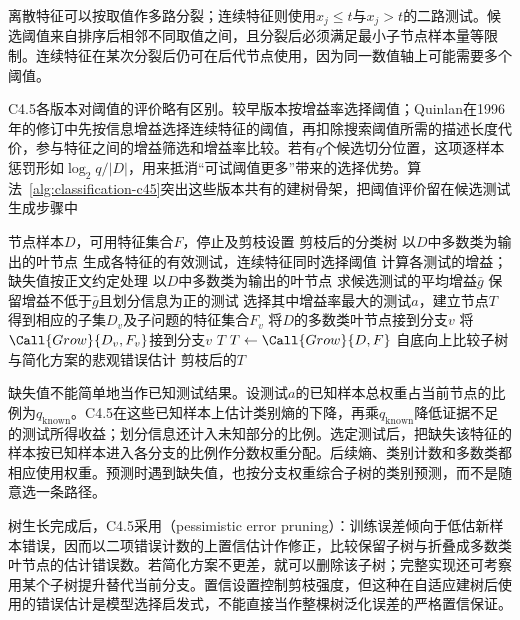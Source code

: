 离散特征可以按取值作多路分裂；连续特征则使用$x_j\leq t$与$x_j>t$的二路测试。候选阈值来自排序后相邻不同取值之间，且分裂后必须满足最小子节点样本量等限制。连续特征在某次分裂后仍可在后代节点使用，因为同一数值轴上可能需要多个阈值。

C4.5各版本对阈值的评价略有区别。较早版本按增益率选择阈值；Quinlan在1996年的修订中先按信息增益选择连续特征的阈值，再扣除搜索阈值所需的描述长度代价，参与特征之间的增益筛选和增益率比较。若有$q$个候选切分位置，这项逐样本惩罚形如$\log_2 q/|D|$，用来抵消“可试阈值更多”带来的选择优势。算法~\ref{alg:classification-c45}突出这些版本共有的建树骨架，把阈值评价留在候选测试生成步骤中

\begin{algorithm}[C4.5的递归生长与后剪枝]
  \label{alg:classification-c45}
  \begin{algorithmic}[1]
    \Require 节点样本$D$，可用特征集合$F$，停止及剪枝设置
    \Ensure 剪枝后的分类树
        \State \Return 以$D$中多数类为输出的叶节点
      \EndIf
      \State 生成各特征的有效测试，连续特征同时选择阈值
      \State 计算各测试的增益；缺失值按正文约定处理
        \State \Return 以$D$中多数类为输出的叶节点
      \EndIf
      \State 求候选测试的平均增益$\bar g$
      \State 保留增益不低于$\bar g$且划分信息为正的测试
      \State 选择其中增益率最大的测试$a$，建立节点$T$
        \State 得到相应的子集$D_v$及子问题的特征集合$F_v$
          \State 将$D$的多数类叶节点接到分支$v$
        \Else
          \State 将$\Call{Grow}{D_v,F_v}$接到分支$v$
        \EndIf
      \EndFor
      \State \Return $T$
    \EndFunction
    \State $T\gets\Call{Grow}{D,F}$
    \State 自底向上比较子树与简化方案的悲观错误估计
    \State \Return 剪枝后的$T$
  \end{algorithmic}
\end{algorithm}

缺失值不能简单地当作已知测试结果。设测试$a$的已知样本总权重占当前节点的比例为$q_{\mathrm{known}}$。C4.5在这些已知样本上估计类别熵的下降，再乘$q_{\mathrm{known}}$降低证据不足的测试所得收益；划分信息还计入未知部分的比例。选定测试后，把缺失该特征的样本按已知样本进入各分支的比例作分数权重分配。后续熵、类别计数和多数类都相应使用权重。预测时遇到缺失值，也按分支权重综合子树的类别预测，而不是随意选一条路径。

树生长完成后，C4.5采用（pessimistic error pruning）：训练误差倾向于低估新样本错误，因而以二项错误计数的上置信估计作修正，比较保留子树与折叠成多数类叶节点的估计错误数。若简化方案不更差，就可以删除该子树；完整实现还可考察用某个子树提升替代当前分支。置信设置控制剪枝强度，但这种在自适应建树后使用的错误估计是模型选择启发式，不能直接当作整棵树泛化误差的严格置信保证。

